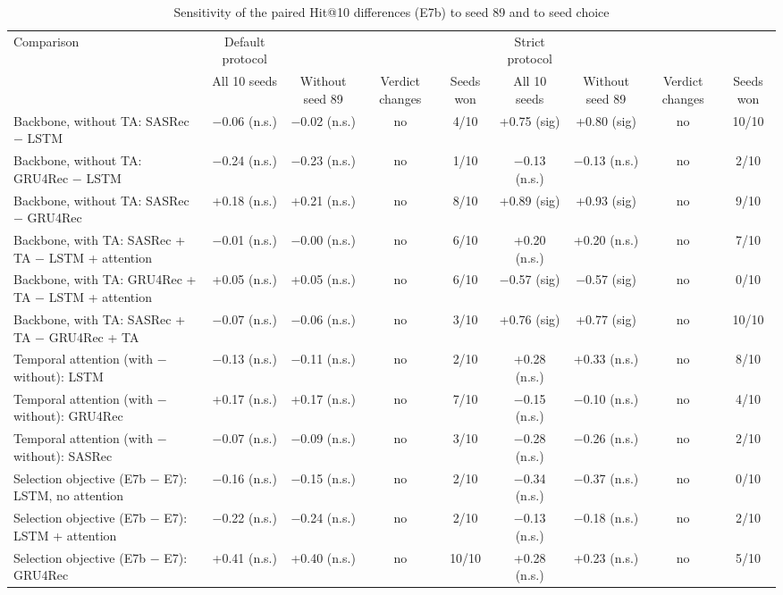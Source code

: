 \begin{table}[t]\centering\footnotesize
\caption{Sensitivity of the paired Hit@10 differences (E7b) to seed 89 and to seed choice}
\begin{tabular}{lcccccccc}\toprule
Comparison & Default protocol &  &  &  & Strict protocol &  &  &  \\
 & All 10 seeds & Without seed 89 & Verdict changes & Seeds won & All 10 seeds & Without seed 89 & Verdict changes & Seeds won \\
\midrule
Backbone, without TA: SASRec $-$ LSTM & $-$0.06 (n.s.) & $-$0.02 (n.s.) & no & 4/10 & +0.75 (sig) & +0.80 (sig) & no & 10/10 \\
Backbone, without TA: GRU4Rec $-$ LSTM & $-$0.24 (n.s.) & $-$0.23 (n.s.) & no & 1/10 & $-$0.13 (n.s.) & $-$0.13 (n.s.) & no & 2/10 \\
Backbone, without TA: SASRec $-$ GRU4Rec & +0.18 (n.s.) & +0.21 (n.s.) & no & 8/10 & +0.89 (sig) & +0.93 (sig) & no & 9/10 \\
Backbone, with TA: SASRec + TA $-$ LSTM + attention & $-$0.01 (n.s.) & $-$0.00 (n.s.) & no & 6/10 & +0.20 (n.s.) & +0.20 (n.s.) & no & 7/10 \\
Backbone, with TA: GRU4Rec + TA $-$ LSTM + attention & +0.05 (n.s.) & +0.05 (n.s.) & no & 6/10 & $-$0.57 (sig) & $-$0.57 (sig) & no & 0/10 \\
Backbone, with TA: SASRec + TA $-$ GRU4Rec + TA & $-$0.07 (n.s.) & $-$0.06 (n.s.) & no & 3/10 & +0.76 (sig) & +0.77 (sig) & no & 10/10 \\
Temporal attention (with $-$ without): LSTM & $-$0.13 (n.s.) & $-$0.11 (n.s.) & no & 2/10 & +0.28 (n.s.) & +0.33 (n.s.) & no & 8/10 \\
Temporal attention (with $-$ without): GRU4Rec & +0.17 (n.s.) & +0.17 (n.s.) & no & 7/10 & $-$0.15 (n.s.) & $-$0.10 (n.s.) & no & 4/10 \\
Temporal attention (with $-$ without): SASRec & $-$0.07 (n.s.) & $-$0.09 (n.s.) & no & 3/10 & $-$0.28 (n.s.) & $-$0.26 (n.s.) & no & 2/10 \\
Selection objective (E7b $-$ E7): LSTM, no attention & $-$0.16 (n.s.) & $-$0.15 (n.s.) & no & 2/10 & $-$0.34 (n.s.) & $-$0.37 (n.s.) & no & 0/10 \\
Selection objective (E7b $-$ E7): LSTM + attention & $-$0.22 (n.s.) & $-$0.24 (n.s.) & no & 2/10 & $-$0.13 (n.s.) & $-$0.18 (n.s.) & no & 2/10 \\
Selection objective (E7b $-$ E7): GRU4Rec & +0.41 (n.s.) & +0.40 (n.s.) & no & 10/10 & +0.28 (n.s.) & +0.23 (n.s.) & no & 5/10 \\

\end{tabular}
\end{table}
